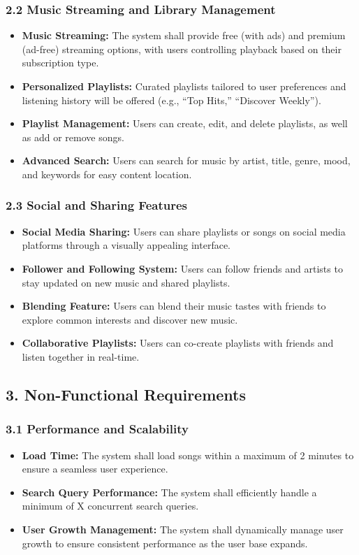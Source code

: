\documentclass[a4paper,10pt]{article}
\begin{document}
\subsubsection{2.2 Music Streaming and Library Management}
    \begin{itemize}[leftmargin=*]
        \item \textbf{Music Streaming:} The system shall provide free (with ads) and premium (ad-free) streaming options, with users controlling playback based on their subscription type.
        \item \textbf{Personalized Playlists:} Curated playlists tailored to user preferences and listening history will be offered (e.g., “Top Hits,” “Discover Weekly”).
        \item \textbf{Playlist Management:} Users can create, edit, and delete playlists, as well as add or remove songs.
        \item \textbf{Advanced Search:} Users can search for music by artist, title, genre, mood, and keywords for easy content location.
    \end{itemize}

\subsubsection{2.3 Social and Sharing Features}
    \begin{itemize}[leftmargin=*]
        \item \textbf{Social Media Sharing:} Users can share playlists or songs on social media platforms through a visually appealing interface.
        \item \textbf{Follower and Following System:} Users can follow friends and artists to stay updated on new music and shared playlists.
        \item \textbf{Blending Feature:} Users can blend their music tastes with friends to explore common interests and discover new music.
        \item \textbf{Collaborative Playlists:} Users can co-create playlists with friends and listen together in real-time.
    \end{itemize}

\subsection{3. Non-Functional Requirements}
\subsubsection{3.1 Performance and Scalability}
    \begin{itemize}[leftmargin=*]
        \item \textbf{Load Time:} The system shall load songs within a maximum of 2 minutes to ensure a seamless user experience.
        \item \textbf{Search Query Performance:} The system shall efficiently handle a minimum of X concurrent search queries.
        \item \textbf{User Growth Management:} The system shall dynamically manage user growth to ensure consistent performance as the user base expands.
    \end{itemize}
\end{document}
